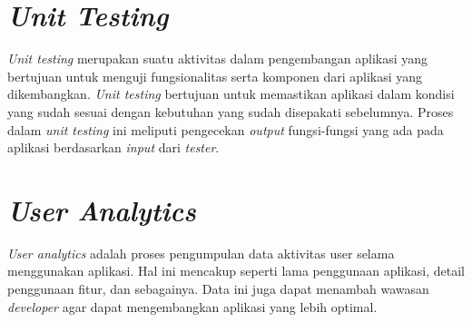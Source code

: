 \begin{spacing}{1.5}
\section{\textit{Unit Testing}}

\textit{Unit testing} merupakan suatu aktivitas dalam pengembangan aplikasi yang bertujuan untuk menguji fungsionalitas serta komponen dari aplikasi yang dikembangkan. \textit{Unit testing} bertujuan untuk memastikan aplikasi dalam kondisi yang sudah sesuai dengan kebutuhan yang sudah disepakati sebelumnya. Proses dalam \textit{unit testing} ini meliputi pengecekan \textit{output} fungsi-fungsi yang ada pada aplikasi berdasarkan \textit{input} dari \textit{tester}.

\section{\textit{User Analytics}}

\textit{User analytics} adalah proses pengumpulan data aktivitas user selama menggunakan aplikasi. Hal ini mencakup seperti lama penggunaan aplikasi, detail penggunaan fitur, dan sebagainya. Data ini juga dapat menambah wawasan \textit{developer} agar dapat mengembangkan aplikasi yang lebih optimal.

\end{spacing}
